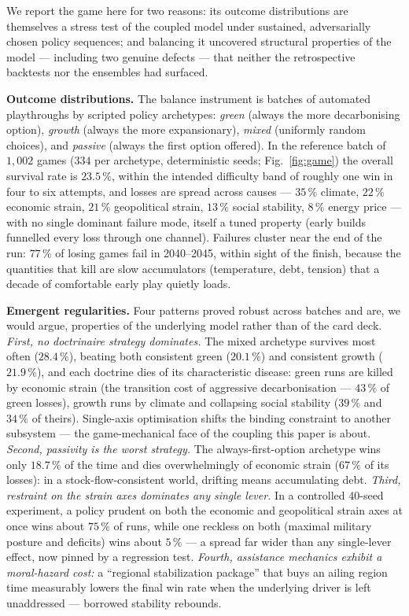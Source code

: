 \documentclass[a4paper,fleqn]{cas-sc}
\begin{document}
We report the game here for two reasons: its outcome distributions are themselves a stress test of
the coupled model under sustained, adversarially chosen policy sequences; and balancing it
uncovered structural properties of the model --- including two genuine defects --- that neither
the retrospective backtests nor the ensembles had surfaced.

\textbf{Outcome distributions.} The balance instrument is batches of automated playthroughs by
scripted policy archetypes: \emph{green} (always the more decarbonising option), \emph{growth}
(always the more expansionary), \emph{mixed} (uniformly random choices), and \emph{passive}
(always the first option offered). In the reference batch of $1{,}002$ games ($334$ per archetype,
deterministic seeds; Fig.~\ref{fig:game}) the overall survival rate is $23.5\,\%$, within the
intended difficulty band of roughly one win in four to six attempts, and losses are spread across
causes --- $35\,\%$ climate, $22\,\%$ economic strain, $21\,\%$ geopolitical strain, $13\,\%$
social stability, $8\,\%$ energy price --- with no single dominant failure mode, itself a tuned
property (early builds funnelled every loss through one channel). Failures cluster near the end of
the run: $77\,\%$ of losing games fail in 2040--2045, within sight of the finish, because the
quantities that kill are slow accumulators (temperature, debt, tension) that a decade of
comfortable early play quietly loads.

\textbf{Emergent regularities.} Four patterns proved robust across batches and are, we would
argue, properties of the underlying model rather than of the card deck.
\emph{First, no doctrinaire strategy dominates.} The mixed archetype survives most often
($28.4\,\%$), beating both consistent green ($20.1\,\%$) and consistent growth ($21.9\,\%$), and
each doctrine dies of its characteristic disease: green runs are killed by economic strain (the
transition cost of aggressive decarbonisation --- $43\,\%$ of green losses), growth runs by
climate and collapsing social stability ($39\,\%$ and $34\,\%$ of theirs). Single-axis
optimisation shifts the binding constraint to another subsystem --- the game-mechanical face of
the coupling this paper is about. \emph{Second, passivity is the worst strategy.} The
always-first-option archetype wins only $18.7\,\%$ of the time and dies overwhelmingly of economic
strain ($67\,\%$ of its losses): in a stock-flow-consistent world, drifting means accumulating
debt. \emph{Third, restraint on the strain axes dominates any single lever.} In a controlled
40-seed experiment, a policy prudent on both the economic and geopolitical strain axes at once
wins about $75\,\%$ of runs, while one reckless on both (maximal military posture and deficits)
wins about $5\,\%$ --- a spread far wider than any single-lever effect, now pinned by a regression
test. \emph{Fourth, assistance mechanics exhibit a moral-hazard cost:} a ``regional stabilization
package'' that buys an ailing region time measurably lowers the final win rate when the underlying
driver is left unaddressed --- borrowed stability rebounds.
\end{document}

